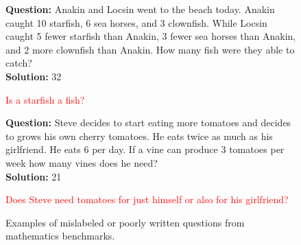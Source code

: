 \begin{figure}[h]
\begin{tcolorbox}[colback=gray!4, colframe=gray!50, arc=2mm, boxrule=0.5pt,left=9pt,right=9pt]
\begin{minipage}{0.48\textwidth}
\begin{tcolorbox}[colback=white, colframe=gray!50, arc=2mm, boxrule=0.5pt, title={Ambiguity, \textit{GSM8K}}, coltitle=black, colbacktitle=gray!10]
\textbf{Question:} Anakin and Locsin went to the beach today. Anakin caught 10 starfish, 6 sea horses, and 3 clownfish. While Locsin caught 5 fewer starfish than Anakin, 3 fewer sea horses than Anakin, and 2 more clownfish than Anakin. How many fish were they able to catch?\\
\textbf{Solution:} 32
\end{tcolorbox}
\hspace{1.4em}\textcolor{red}{Is a starfish a fish?}
\end{minipage}
\hfill
\begin{minipage}{0.48\textwidth}
    \begin{tcolorbox}[colback=white, colframe=gray!50, arc=2mm, boxrule=0.5pt, title={Ambiguity, \textit{GSM8K}}, coltitle=black, colbacktitle=gray!10]
\textbf{Question:} Steve decides to start eating more tomatoes and decides to grows his own cherry tomatoes.  He eats twice as much as his girlfriend.  He eats 6 per day.  If a vine can produce 3 tomatoes per week how many vines does he need?
\\
\textbf{Solution:} 21
    \end{tcolorbox}
    \begin{adjustwidth}{1.4em}{0pt} \textcolor{red}{Does Steve need tomatoes for just himself or also for his girlfriend?}
    \end{adjustwidth}
\end{minipage}
\end{tcolorbox}
    \caption{Examples of mislabeled or poorly written questions from mathematics benchmarks.}
    \label{appfig:math_label_errors}
\end{figure}








